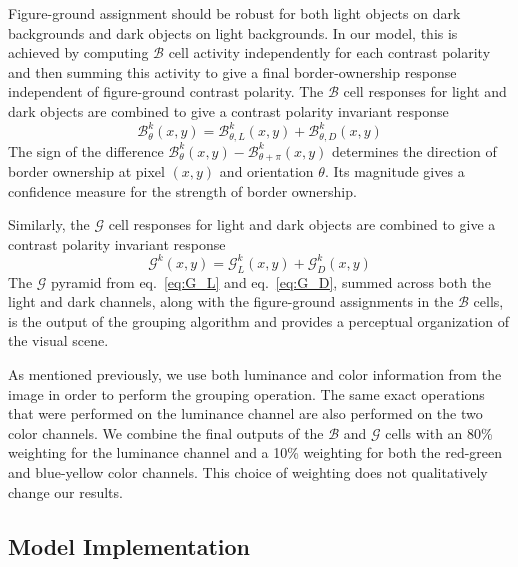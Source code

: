 Figure-ground assignment should be robust for both light objects on dark backgrounds and dark objects on light backgrounds. In our model, this is achieved by computing $\mathcal{B}$ cell activity independently for each contrast polarity and then summing this activity to give a final border-ownership response independent of figure-ground contrast polarity. The $\mathcal{B}$ cell responses for light and dark objects are combined to give a contrast polarity invariant response
\begin{equation}
\mathcal{B}^k_{\theta}(x,y) =
\mathcal{B}^k_{\theta,L}(x,y)+\mathcal{B}^k_{\theta,D}(x,y)
\label{eq:BOS}
\end{equation}
The sign of the difference $\mathcal{B}^k_{\theta}(x,y)-\mathcal{B}^k_{\theta+\pi}(x,y)$ determines the direction of border ownership at pixel $(x,y)$ and orientation $\theta$. Its magnitude gives a confidence measure for the strength of border ownership.

Similarly, the $\mathcal{G}$ cell responses for light and dark objects are combined to give a contrast polarity invariant response
\begin{equation}
\mathcal{G}^k(x,y) =
\mathcal{G}^k_{L}(x,y)+\mathcal{G}^k_{D}(x,y)
\label{eq:G}
\end{equation}
The $\mathcal{G}$ pyramid from eq.~\ref{eq:G_L} and eq.~\ref{eq:G_D}, summed across both the light and dark channels, along with the figure-ground assignments in the $\mathcal{B}$ cells, is the output of the grouping algorithm and provides a perceptual organization of the visual scene.

As mentioned previously, we use both luminance and color information from the image in order to perform the grouping operation. The same exact operations that were performed on the luminance channel are also performed on the two color channels. We combine the final outputs of the $\mathcal{B}$ and $\mathcal{G}$ cells with an 80\% weighting for the luminance channel and a 10\% weighting for both the red-green and blue-yellow color channels. This choice of weighting does not qualitatively change our results.

\subsection{Model Implementation}
\label{sec:implementation}

